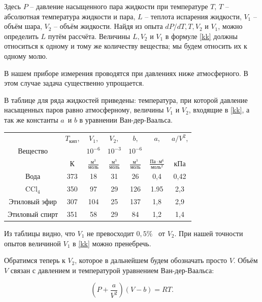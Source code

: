 \documentclass[a4paper, 12pt]{article}
\begin{document}
\bigskip

Здесь  $P$ -- давление насыщенного пара жидкости при температуре  $T$,  $T$ -- абсолютная температура жидкости и пара, $L$ -- теплота испарения жидкости,  $V_1$ -- объём шара,  $V_2$ -- объём жидкости. Найдя из опыта  $dP/dT, T, V_2$ и $V_1$, можно определить $L$ путём рассчёта. Величины $L, V_2$ и $V_1$ в формуле \eqref{kk} должны относиться к одному и тому же количеству вещества; мы будем относить их к одному молю. 

В нашем приборе измерения проводятся при давлениях ниже атмосферного. В этом случае задача существенно упрощается. 

В таблице для ряда жидкостей приведены: температура, при которой давление насыщенных паров равно атмосферному, величины $V_1$ и $V_2$, входящие в \eqref{kk}, а так же константы $a$ и $b$ в уравнении Ван-дер-Ваальса. 

\bigskip

\begin{center}
	\begin{tabular}{|c|c|c|c|c|c|c|} 
	\hline
	& $T_{\text{кип}}$,&$ V_1$, &$ V_2 , $&$ b$,& $ a$, & $a / V^2$, \\
	Вещество&  & $10^{-6}$ &$10^{-3}$&$10^{-6}$&& \\
	& К &$\frac{\text{м}^3}{\text{моль}} $&$\frac{\text{м}^3}{\text{моль}} $&$\frac{\text{м}^3}{\text{моль}} $&$\frac{\text{Па} \cdot \text{м}^6}{\text{моль}^2} $ &кПа\\ 
	\hline 
	Вода & 373 & 18 & 31 & 26 & 0,4& 0,42 \\ 
	CCl$_4$ & 350 & 97 & 29 & 126 & 1.95 & 2,3 \\ 
	Этиловый эфир & 307 & 104 & 25 & 137 & 1,8 & 2,9 \\ 
	Этиловый спирт & 351 & 58 & 29 & 84 & 1,2 & 1,4 \\ \hline
	\end{tabular}
\end{center}

\bigskip

Из таблицы видно, что $V_1$ не превосходит $0,5 \%$  от  $V_2$. При нашей точности опытов величиной $V_1$ в \eqref{kk} можно пренебречь. 

Обратимся теперь к $V_2$, которое в дальнейшем будем обозначать просто $V$. Объём $V$  связан с давлением и температурой уравнением Ван-дер-Ваальса:

\bigskip

\begin{equation} \label{vv}
	\left(P + \dfrac{a}{V^2}\right)\left(V - b\right)= RT.
\end{equation}
\end{document}
